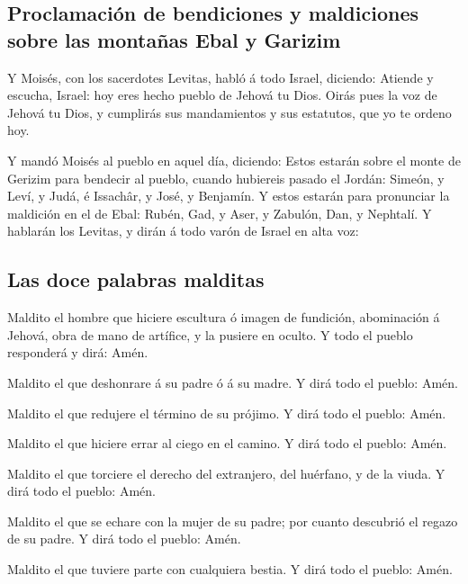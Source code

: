 \hypertarget{proclamaciuxf3n-de-bendiciones-y-maldiciones-sobre-las-montauxf1as-ebal-y-garizim}{%
\subsection{Proclamación de bendiciones y maldiciones sobre las montañas
Ebal y
Garizim}\label{proclamaciuxf3n-de-bendiciones-y-maldiciones-sobre-las-montauxf1as-ebal-y-garizim}}

 Y Moisés, con los sacerdotes Levitas, habló á todo Israel,
diciendo: Atiende y escucha, Israel: hoy eres hecho pueblo de Jehová tu
Dios.  Oirás pues la voz de Jehová tu Dios, y cumplirás sus
mandamientos y sus estatutos, que yo te ordeno hoy.

 Y mandó Moisés al pueblo en aquel día, diciendo:
 Estos estarán sobre el monte de Gerizim para bendecir al
pueblo, cuando hubiereis pasado el Jordán: Simeón, y Leví, y Judá, é
Issachâr, y José, y Benjamín.  Y estos estarán para
pronunciar la maldición en el de Ebal: Rubén, Gad, y Aser, y Zabulón,
Dan, y Nephtalí.  Y hablarán los Levitas, y dirán á todo
varón de Israel en alta voz:

\hypertarget{las-doce-palabras-malditas}{%
\subsection{Las doce palabras
malditas}\label{las-doce-palabras-malditas}}

 Maldito el hombre que hiciere escultura ó imagen de
fundición, abominación á Jehová, obra de mano de artífice, y la pusiere
en oculto. Y todo el pueblo responderá y dirá: Amén.

 Maldito el que deshonrare á su padre ó á su madre. Y dirá
todo el pueblo: Amén.

 Maldito el que redujere el término de su prójimo. Y dirá
todo el pueblo: Amén.

 Maldito el que hiciere errar al ciego en el camino. Y dirá
todo el pueblo: Amén.

 Maldito el que torciere el derecho del extranjero, del
huérfano, y de la viuda. Y dirá todo el pueblo: Amén.

 Maldito el que se echare con la mujer de su padre; por
cuanto descubrió el regazo de su padre. Y dirá todo el pueblo: Amén.

 Maldito el que tuviere parte con cualquiera bestia. Y dirá
todo el pueblo: Amén.

